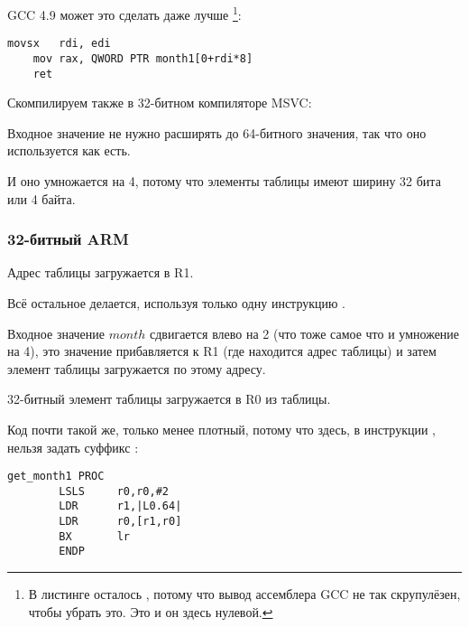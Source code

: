 \Optimizing GCC 4.9 может это сделать даже лучше
\footnote{В листинге осталось , потому что вывод ассемблера GCC не так скрупулёзен, чтобы убрать это.
Это  и он здесь нулевой.}:

\begin{lstlisting}[caption=\Optimizing GCC 4.9 x64]
	movsx	rdi, edi
	mov	rax, QWORD PTR month1[0+rdi*8]
	ret
\end{lstlisting}


Скомпилируем также в 32-битном компиляторе MSVC:



Входное значение не нужно расширять до 64-битного значения, так что оно используется как есть.

И оно умножается на 4, потому что элементы таблицы имеют ширину 32 бита или 4 байта.

\subsubsection{32-битный ARM}




Адрес таблицы загружается в R1.

Всё остальное делается, используя только одну инструкцию \LDR.

Входное значение $month$ сдвигается влево на 2 (что тоже самое что и умножение на 4), это значение
прибавляется к R1 (где находится адрес таблицы) и затем элемент таблицы загружается по этому адресу.

32-битный элемент таблицы загружается в R0 из таблицы.


Код почти такой же, только менее плотный, потому что здесь, в инструкции \LDR, нельзя задать суффикс \LSL:

\begin{lstlisting}
get_month1 PROC
        LSLS     r0,r0,#2
        LDR      r1,|L0.64|
        LDR      r0,[r1,r0]
        BX       lr
        ENDP
\end{lstlisting}

